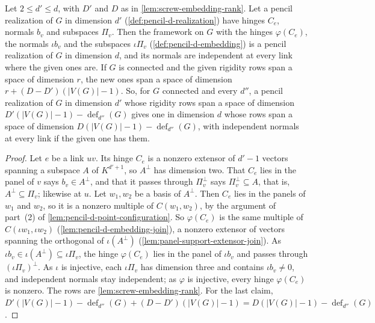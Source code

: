 \begin{lemma}
  \label{lem:pencil-d-embed-realization}
  \leanok
  Let $2 \le d' \le d$, with $D'$ and $D$ as in
  \cref{lem:screw-embedding-rank}. Let a pencil realization of $G$ in
  dimension $d'$ (\cref{def:pencil-d-realization}) have hinges $C_e$,
  normals $b_v$ and subspaces $\Pi_v$. Then the framework on $G$ with the
  hinges $\varphi(C_e)$, the normals $\iota b_v$ and the subspaces
  $\iota \Pi_v$ (\cref{def:pencil-d-embedding}) is a pencil realization
  of $G$ in dimension $d$, and its normals are independent at every link
  where the given ones are. If $G$ is connected and the given rigidity
  rows span a space of dimension $r$, the new ones span a space of
  dimension $r + (D - D')(|V(G)| - 1)$. So, for $G$ connected and every
  $d''$, a pencil realization of $G$ in dimension $d'$ whose rigidity
  rows span a space of dimension
  $D'(|V(G)| - 1) - \operatorname{def}_{d''}(G)$ gives one in dimension
  $d$ whose rows span a space of dimension
  $D(|V(G)| - 1) - \operatorname{def}_{d''}(G)$, with independent
  normals at every link if the given one has them.
\end{lemma}
\begin{proof}
  \leanok
  Let $e$ be a link $uv$. Its hinge $C_e$ is a nonzero extensor of
  $d' - 1$ vectors spanning a subspace $A$ of $K^{d'+1}$, so $A^{\perp}$
  has dimension two. That $C_e$ lies in the panel of $v$ says
  $b_v \in A^{\perp}$, and that it passes through $\Pi_v^{\perp}$ says
  $\Pi_v^{\perp} \subseteq A$, that is, $A^{\perp} \subseteq \Pi_v$;
  likewise at $u$. Let $w_1, w_2$ be a basis of $A^{\perp}$. Then $C_e$
  lies in the panels of $w_1$ and $w_2$, so it is a nonzero multiple of
  $C(w_1, w_2)$, by the argument of part~(2) of
  \cref{lem:pencil-d-point-configuration}. So $\varphi(C_e)$ is the same
  multiple of $C(\iota w_1, \iota w_2)$
  (\cref{lem:pencil-d-embedding-join}), a nonzero extensor of vectors
  spanning the orthogonal of $\iota(A^{\perp})$
  (\cref{lem:panel-support-extensor-join}). As
  $\iota b_v \in \iota(A^{\perp}) \subseteq \iota \Pi_v$, the hinge
  $\varphi(C_e)$ lies in the panel of $\iota b_v$ and passes through
  $(\iota \Pi_v)^{\perp}$. As $\iota$ is injective, each $\iota \Pi_v$
  has dimension three and contains $\iota b_v \neq 0$, and independent
  normals stay independent; as $\varphi$ is injective, every hinge
  $\varphi(C_e)$ is nonzero. The rows are
  \cref{lem:screw-embedding-rank}. For the last claim,
  $D'(|V(G)| - 1) - \operatorname{def}_{d''}(G) + (D - D')(|V(G)| - 1)
  = D(|V(G)| - 1) - \operatorname{def}_{d''}(G)$.
\end{proof}

